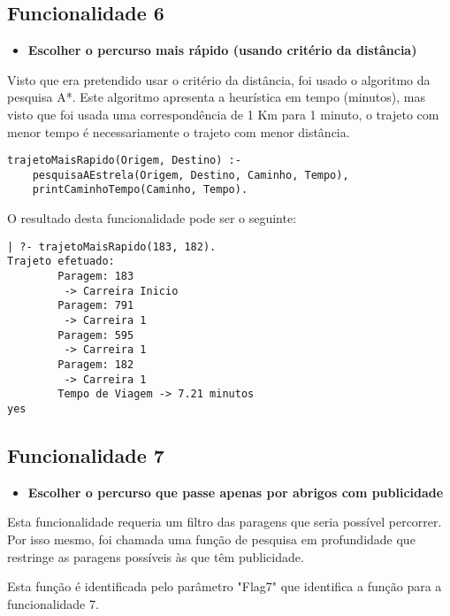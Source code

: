 \documentclass[a4paper,12pt]{report}
\begin{document}
\subsection{Funcionalidade 6}
\begin{itemize}
    \item \textbf{Escolher o percurso mais rápido (usando critério da distância)}
\end{itemize}

\par Visto que era pretendido usar o critério da distância, foi usado o algoritmo da pesquisa A*. Este algoritmo apresenta a heurística em tempo (minutos), mas visto que foi usada uma correspondência de 1 Km para 1 minuto, o trajeto com menor tempo é necessariamente o trajeto com menor distância.


\begin{verbatim}
trajetoMaisRapido(Origem, Destino) :-
    pesquisaAEstrela(Origem, Destino, Caminho, Tempo),
    printCaminhoTempo(Caminho, Tempo).
\end{verbatim}

O resultado desta funcionalidade pode ser o seguinte:

\begin{verbatim}
| ?- trajetoMaisRapido(183, 182).
Trajeto efetuado: 
        Paragem: 183
         -> Carreira Inicio
        Paragem: 791
         -> Carreira 1
        Paragem: 595
         -> Carreira 1
        Paragem: 182
         -> Carreira 1
        Tempo de Viagem -> 7.21 minutos
yes
\end{verbatim}


\vspace{10cm}

\subsection{Funcionalidade 7}
\begin{itemize}
    \item \textbf{Escolher o percurso que passe apenas por abrigos com publicidade}
\end{itemize}

\par Esta funcionalidade requeria um filtro das paragens que seria possível percorrer. Por isso mesmo, foi chamada uma função de pesquisa em profundidade que restringe as paragens possíveis às que têm publicidade. 
\par Esta função é identificada pelo parâmetro "Flag7"\hspace{0.001cm} que identifica a função para a funcionalidade 7.
\end{document}
